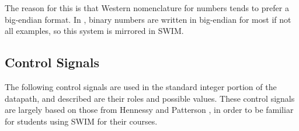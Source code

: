 \documentclass[
    paper=letter,
    parskip=half,
    fontsize=12pt,
    titlepage=firstiscover,
    toc=bibliography,
    numbers=endperiod
]{scrartcl}
\begin{document}
The reason for this is that Western nomenclature for numbers tends to
prefer a big-endian format. In \cite{hennessy-patterson}, binary numbers
are written in big-endian for most if not all examples, so this system
is mirrored in SWIM.

\subsection{Control Signals}
\label{subsec:control-signals}

The following control signals are used in the standard integer portion
of the datapath, and described are their roles and possible values.
These control signals are largely based on those from Hennessy and
Patterson \cite{hennessy-patterson}, in order to be familiar for
students using SWIM for their courses.
\end{document}
